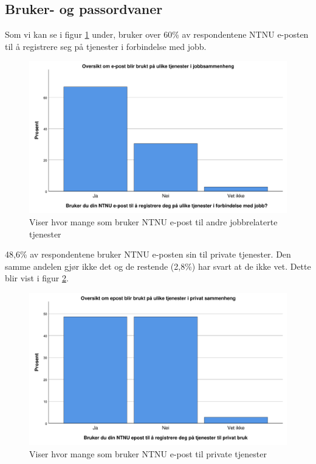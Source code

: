 \subsection{Bruker- og passordvaner}
Som vi kan se i figur \ref{fig:case2-epost-jobb} under, bruker over 60\% av respondentene NTNU e-posten til å registrere seg på tjenester i forbindelse med jobb.
\begin{figure}[H]
    \centering
    \includegraphics[scale=0.5]{case_2/bilder/spss/epost_jobb.pdf}
    \caption[E-post til jobbrelaterte tjenester]{Viser hvor mange som bruker NTNU e-post til andre jobbrelaterte tjenester}
    \label{fig:case2-epost-jobb}
\end{figure}

48,6\% av respondentene bruker NTNU e-posten sin til private tjenester. Den samme andelen gjør ikke det og de restende (2,8\%) har svart at de ikke vet. Dette blir vist i figur \ref{fig:case2-epost-privat}.
\begin{figure}[H]
    \centering
    \includegraphics[scale=0.5]{case_2/bilder/spss/epost_privat.pdf}
    \caption[E-post til private tjenester]{Viser hvor mange som bruker NTNU e-post til private tjenester}
    \label{fig:case2-epost-privat}
\end{figure}

